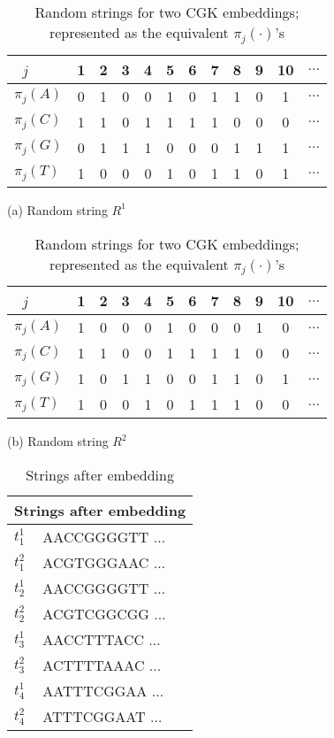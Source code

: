 \begin{table}[]
\begin{minipage}[]{0.49\textwidth}
\centering
\begin{tabular}{l*{10}{c}r}
\ $j$              & 1 & 2 & 3 & 4 & 5  & 6 & 7 & 8  & 9 & 10 & $\dots$  \\
\hline
$\pi_j(A)$    & 0 & 1 & 0 & 0 & 1 & 0 & 1 & 1 & 0 & 1  & $\dots$\\
$\pi_j(C)$     & 1 & 1 & 0 & 1 & 1 & 1 & 1 & 0 & 0 & 0 & $\dots$ \\
$\pi_j(G)$    & 0 & 1 & 1 & 1 & 0& 0 & 0 & 1 & 1 & 1  & $\dots$\\
$\pi_j(T)$     & 1 & 0 & 0 & 0 & 1 & 0 & 1 & 1 & 0 & 1  & $\dots$ \\
\end{tabular}
\centerline{(a) Random string $R^1$}
\end{minipage}
\begin{minipage}[]{0.49\textwidth}
\centering
\begin{tabular}{l*{10}{c}r}
\ $j$              & 1 & 2 & 3 & 4 & 5  & 6 & 7 & 8  & 9 & 10 & $\dots$  \\
\hline
$\pi_j(A)$    & 1 & 0 & 0 & 0 & 1 & 0 & 0 & 0 & 1 & 0  & $\dots$\\
$\pi_j(C)$     & 1 & 1 & 0 & 0 & 1 & 1 & 1 & 1 & 0 & 0 & $\dots$ \\
$\pi_j(G)$    & 1 & 0 & 1 & 1 & 0& 0 & 1 & 1 & 0 & 1  & $\dots$\\
$\pi_j(T)$     & 1 & 0 & 0 & 1 & 0 & 1 & 1 & 1 & 0 & 0  & $\dots$ \\
\end{tabular}
\centerline{(b) Random string $R^2$}
\end{minipage}
 \caption{Random strings for two CGK embeddings; represented as the equivalent $\pi_j(\cdot)$'s} 
\label{tab:CGK}
\end{table}

\begin{table}[]
\centering
\begin{tabular}{ |l|l| } 
  \hline
  \multicolumn{2}{|c|}{Strings after embedding} \\
  \hline
  $t_1^1$ & AACCGGGGTT $\dots$ \\
  $t_1^2$ & ACGTGGGAAC $\dots$\\
  $t_2^1$ & AACCGGGGTT $\dots$\\
  $t_2^2$ & ACGTCGGCGG $\dots$\\
  $t_3^1$ & AACCTTTACC $\dots$\\
  $t_3^2$ & ACTTTTAAAC $\dots$\\
  $t_4^1$ & AATTTCGGAA $\dots$\\
  $t_4^2$ & ATTTCGGAAT $\dots$\\
  \hline
\end{tabular}
\caption{Strings after embedding}  
\label{tab:strs2}
\end{table}


